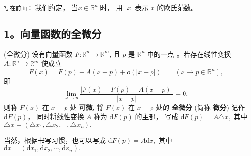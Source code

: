 
\verb|写在前面：| 我们约定， 当$x\in \mathbb{R}^n$ 时， 用 $|x|$ 表示 $x$ 的欧氏范数。 
\subsection{1。向量函数的全微分}
\begin{definition}{(全微分)}
设有向量函数 $F:\mathbb{R}^{n}\rightarrow\mathbb{R}^{m}$, 且 $p$ 是 $\mathbb{R}^n$ 中的一点 。若存在线性变换 $A:\mathbb{R}^{n}\rightarrow\mathbb{R}^{m}$
使成立
\begin{equation}\label{eq_vecdif_1}
F(x)=F(p)+A(x-p)+o(| x-p| )\quad\quad(x\rightarrow p\in\mathbb{R}^{n}),
\end{equation}
即
\[
{\displaystyle \lim_{x\rightarrow p}{\displaystyle \frac{|F(x)-F(p)-A(x-p)|}{| x-p| }=0,}}
\]
则称 $F(x)$ 在 $x=p$ 处 \textbf{可微}, 将 $F(x)$ 在 $x=p$ 处的 \textbf{全微分} (简称 \textbf{微分}) 记作  $\mathrm{d}F(p)$， 同时将线性变换 $A$ 称为 $\mathrm{d}F(p)$ 的主部， 写成  $\mathrm{d}F(p)=A \triangle x,$ 其中 $\triangle x=(\triangle x_1,\triangle x_2,\cdots,\triangle x_n).$ 

当然，根据书写习惯，也可以写成  $\mathrm{d}F(p)=A\mathrm{d}x,$ 其中 $\mathrm{d}x=(\mathrm{d}x_1,\mathrm{d}x_2,\cdots,\mathrm{d}x_n).$ 
\end{definition}

